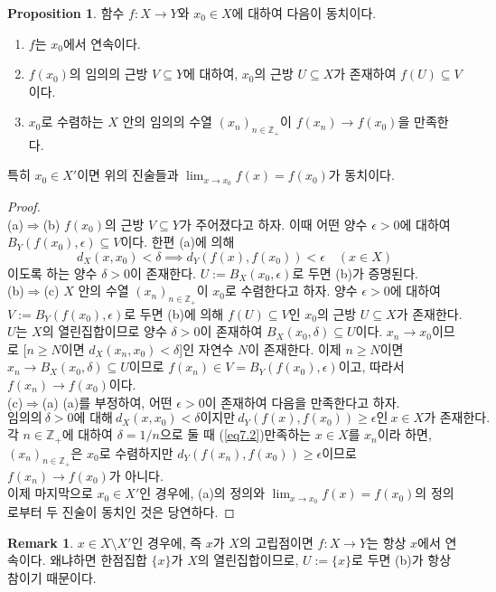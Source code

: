 \documentclass[11pt]{book}
\numberwithin{equation}{chapter}
\def\ZZ{\mathbb{Z}}
\def\eps{\epsilon}
\theoremstyle{definition}
\newtheorem{prop}[thm]{Proposition}
\newtheorem*{rem}{Remark}
\newenvironment{enum}
	{\begin{enumerate}[label=(\alph*), leftmargin=2\parindent]}
	{\end{enumerate}}
\begin{document}
\begin{prop} \label{prop 7.1.7}
    함수 \(f : X \to Y\)와 \(x_0 \in X\)에 대하여 다음이 동치이다.
    \begin{enum}
        \item \(f\)는 \(x_0\)에서 연속이다.
        \item \(f(x_0)\)의 임의의 근방 \(V \subseteq Y\)에 대하여, \(x_0\)의 근방 \(U \subseteq X\)가 존재하여 \(f(U) \subseteq V\)이다.
        \item \(x_0\)로 수렴하는 \(X\) 안의 임의의 수열 \((x_n)_{n \in \ZZ_+}\)이 \(f(x_n) \to f(x_0)\)을 만족한다.
    \end{enum}
    특히 \(x_0 \in X'\)이면 위의 진술들과 \(\lim_{x \to x_0} f(x) = f(x_0)\)가 동치이다.
\end{prop}
\begin{proof}
    \quad\\
    (a)\(\Rightarrow\)(b) \(f(x_0)\)의 근방 \(V \subseteq Y\)가 주어졌다고 하자. 이때 어떤 양수 \(\eps > 0\)에 대하여 \(B_Y(f(x_0), \eps) \subseteq V\)이다. 한편 (a)에 의해
    \[
        d_X(x, x_0) < \delta \implies d_Y(f(x), f(x_0)) < \eps \quad (x \in X)
    \]
    이도록 하는 양수 \(\delta > 0\)이 존재한다. \(U := B_X(x_0, \eps)\)로 두면 (b)가 증명된다.\\
    (b)\(\Rightarrow\)(c) \(X\) 안의 수열 \((x_n)_{n \in \ZZ_+}\)이 \(x_0\)로 수렴한다고 하자. 양수 \(\eps > 0\)에 대하여 \(V := B_Y(f(x_0), \eps)\)로 두면 (b)에 의해 \(f(U) \subseteq V\)인 \(x_0\)의 근방 \(U \subseteq X\)가 존재한다. \(U\)는 \(X\)의 열린집합이므로 양수 \(\delta > 0\)이 존재하여 \(B_X(x_0, \delta) \subseteq U\)이다. \(x_n \to x_0\)이므로 [\(n \ge N\)이면 \(d_X(x_n, x_0) < \delta\)]인 자연수 \(N\)이 존재한다. 이제 \(n \ge N\)이면 \(x_n \to B_X(x_0, \delta) \subseteq U\)이므로 \(f(x_n) \in V = B_Y(f(x_0), \eps)\)이고, 따라서 \(f(x_n) \to f(x_0)\)이다.\\
    (c)\(\Rightarrow\)(a) (a)를 부정하여, 어떤 \(\eps > 0\)이 존재하여 다음을 만족한다고 하자.
    \begin{equation} \label{eq7.2}
        \text{임의의} \ \delta > 0\text{에 대해} \ d_X(x, x_0) < \delta\text{이지만} \ d_Y(f(x), f(x_0)) \ge \eps\text{인} \ x \in X\text{가 존재한다.}
    \end{equation}
    각 \(n \in \ZZ_+\)에 대하여 \(\delta = 1/n\)으로 둘 때 (\ref{eq7.2})\를 만족하는 \(x \in X\)를 \(x_n\)이라 하면, \((x_n)_{n \in \ZZ_+}\)은 \(x_0\)로 수렴하지만 \(d_Y(f(x_n), f(x_0)) \ge \eps\)이므로 \(f(x_n) \to f(x_0)\)가 아니다.\\
    이제 마지막으로 \(x_0 \in X'\)인 경우에, (a)의 정의와 \(\lim_{x \to x_0} f(x) = f(x_0)\)의 정의로부터 두 진술이 동치인 것은 당연하다.
\end{proof}
\begin{rem}
    \(x \in X \setminus X'\)인 경우에, 즉 \(x\)가 \(X\)의 고립점이면 \(f : X \to Y\)는 항상 \(x\)에서 연속이다. 왜냐하면 한점집합 \(\{x\}\)가 \(X\)의 열린집합이므로, \(U := \{x\}\)로 두면 (b)가 항상 참이기 때문이다.
\end{rem}
\end{document}
